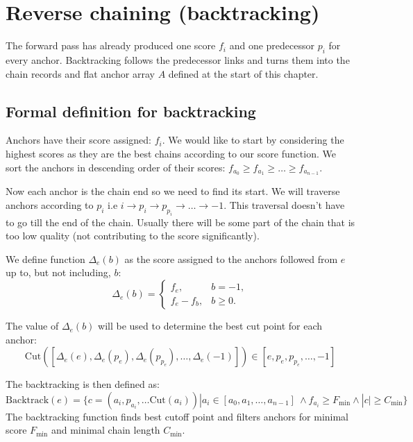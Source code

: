 
\section{Reverse chaining (backtracking)}

The forward pass has already produced one score \(f_i\) and one predecessor
\(p_i\) for every anchor. Backtracking follows the predecessor links and turns
them into the chain records and flat anchor array \(A\) defined at the start of
this chapter.

\subsection{Formal definition for backtracking}

Anchors have their score assigned: \(f_i\). We would like to start by considering the highest scores as they are the best chains according to our score function. 
We sort the anchors in descending order of their scores: \(f_{a_0} \geq f_{a_1} \geq \ldots \geq f_{a_{n-1}}\).

Now each anchor is the chain end so we need to find its start. We will traverse anchors according to $p_i$ i.e $i \rightarrow p_i \rightarrow p_{p_i} \rightarrow \ldots \rightarrow -1$.
This traversal doesn't have to go till the end of the chain. Usually there will be some part of the chain that is too low quality (not contributing to the score significantly).

We define function $\Delta_e(b)$ as the score assigned to the anchors followed from $e$ up to, but not including, $b$:
\begin{equation}
  \Delta_e(b)=
  \begin{cases}
    f_e, & b=-1,\\
    f_e-f_b, & b\geq0.
  \end{cases}
  \label{eq:chaining-backtrack-contribution}
\end{equation}

The value of $\Delta_e(b)$ will be used to determine the best cut point for each anchor:
\begin{equation}
  \text{Cut}([\Delta_e(e), \Delta_e(p_e), \Delta_e(p_{p_e}), \ldots, \Delta_e(-1)]) \in [e, p_e, p_{p_e}, \ldots, -1]
\end{equation}

The backtracking is then defined as:
\begin{equation}
  \text{Backtrack}(e) = \{c = (a_i, p_{a_i}, \ldots \text{Cut}(a_i)) | a_i \in [a_0, a_1, \ldots, a_{n-1}]\ \land f_{a_i} \geq F_{\text{min}} \land |c| \geq C_{\text{min}}\}
\end{equation}
The backtracking function finds best cutoff point and filters anchors for minimal score $F_{\text{min}}$ and minimal chain length $C_{\text{min}}$.

